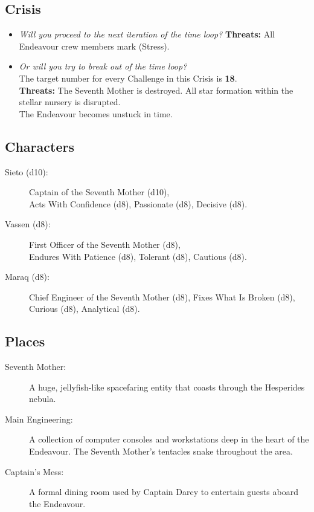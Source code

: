 \documentclass[11pt, a5paper, parskip=half-, DIV=12]{scrartcl}
\begin{document}
\subsection*{Crisis}
\begin{itemize}
	\item \textit{Will you proceed to the next iteration of the time loop?} \textbf{Threats:} All Endeavour crew members mark  (Stress). 
	\item \textit{Or will you try to break out of the time loop?} \\ The target number for every Challenge in this Crisis is \textbf{18}. \\ \textbf{Threats:} The Seventh Mother is destroyed. All star formation within the stellar nursery is disrupted. \\ The Endeavour becomes unstuck in time.
\end{itemize}
\newpage

\subsection*{Characters}
\begin{description}
	\item[Sieto (d10):] Captain of the Seventh Mother (d10), \\ Acts With Confidence (d8), Passionate (d8), Decisive (d8).
	\item[Vassen (d8):] First Officer of the Seventh Mother (d8), \\ Endures With Patience (d8), Tolerant (d8),  Cautious (d8).
	\item[Maraq (d8):] Chief Engineer of the Seventh Mother  (d8), Fixes What Is Broken (d8), Curious (d8), Analytical (d8).
\end{description}

\subsection*{Places}
\begin{description}
	\item[Seventh Mother:] A huge, jellyfish-like spacefaring entity that coasts through the Hesperides nebula.
	\item[Main Engineering:] A collection of computer consoles and workstations deep in the heart of the Endeavour. The Seventh Mother's tentacles snake throughout the area.
	\item[Captain's Mess:] A formal dining room used by Captain Darcy to entertain guests aboard the Endeavour.
\end{description}
\end{document}
